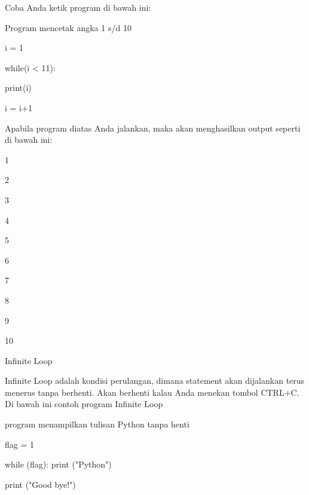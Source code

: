 Coba Anda ketik program di bawah ini:\vspace{\baselineskip}
\vspace{\baselineskip}
 \par
Program mencetak angka 1 s/d 10 \par
\vspace{12pt}
i = 1 \par
while(i < 11): \par
 print(i) \par
 i = i+1 \par
\vspace{\baselineskip}
Apabila program diatas Anda jalankan, maka akan menghasilkan output seperti di bawah ini:\vspace{\baselineskip}
\vspace{\baselineskip}
 \par
1 \par
2 \par
3 \par
4 \par
5 \par
6 \par
7 \par
8 \par
9 \par
10 \par
\vspace{12pt}
\vspace{\baselineskip}
\vspace{12pt}
Infinite Loop \par
\vspace{\baselineskip}
Infinite Loop adalah kondisi perulangan, dimana statement akan dijalankan terus menerus tanpa berhenti. Akan berhenti kalau Anda menekan tombol CTRL+C.\vspace{\baselineskip}
\vspace{\baselineskip}
Di bawah ini contoh program Infinite Loop\vspace{\baselineskip}
\vspace{\baselineskip}
 \par
program menampilkan tulisan Python tanpa henti \par
\vspace{12pt}
flag = 1 \par
\vspace{12pt}
while (flag): print ("Python") \par
print ("Good bye!") \par
\vspace{12pt}
\vspace{\baselineskip}
